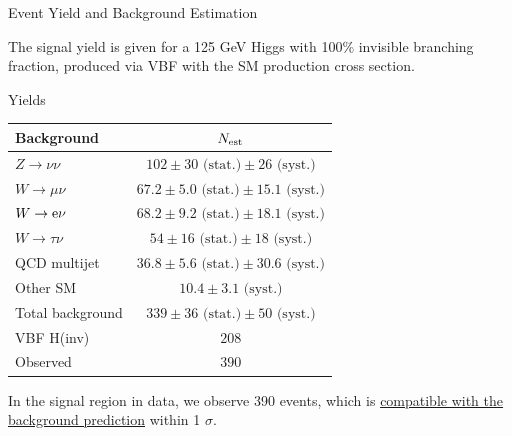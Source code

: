 \documentclass[8pt]{beamer}
\newcommand{\stat}{\text{ (stat.)}}
\newcommand{\syst}{\text{ (syst.)}}
\begin{document}
\begin{frame}{Event Yield and Background Estimation}

The signal yield is given for a 125 GeV Higgs with 100\% invisible branching fraction, produced via VBF with the SM production cross section.

\begin{block}{Yields}

\begin{table}[th!]
\centering
\begin{tabular}{|l|c|}
\hline
Background 	 		& $N_{\rm est}$ \\
\hline
$Z \rightarrow \nu\nu$ 		& $102 \pm 30 \stat \pm 26 \syst$	\\
$W \rightarrow \mu\nu$ 	 	& $67.2 \pm 5.0 \stat \pm 15.1 \syst$ 	\\
$W \rightarrow {\rm e} \nu$  	& $68.2 \pm 9.2 \stat \pm 18.1 \syst$	\\
$W \rightarrow \tau \nu$ 	& $54 \pm 16 \stat \pm 18 \syst$ \\
QCD multijet 	 		& $36.8 \pm 5.6 \stat \pm 30.6 \syst$ \\
Other SM			& $10.4 \pm 3.1 \syst$ \\
\hline
Total background		& $339 \pm 36 \stat \pm 50 \syst$  \\
VBF H(inv)                      & $208$ \\
Observed 			& $390$  \\	
\hline
\end{tabular}
\end{table}

\end{block}

In the signal region in data, we observe 390 events, which is \uline{compatible with the background prediction} within 1 $\sigma$.

\end{frame}
\end{document}
